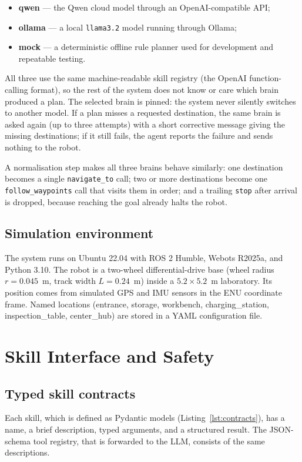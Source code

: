 \documentclass[11pt]{article}
\begin{document}
\begin{itemize}
  \item \textbf{qwen} --- the Qwen cloud model through an
  OpenAI-compatible API;
  \item \textbf{ollama} --- a local \texttt{llama3.2} model running through
  Ollama;
  \item \textbf{mock} --- a deterministic offline rule planner used for
  development and repeatable testing.
\end{itemize}

All three use the same machine-readable skill registry (the OpenAI
function-calling format), so the rest of the system does not know or care which
brain produced a plan. The selected brain is pinned: the system never
silently switches to another model. If a plan misses a requested destination,
the same brain is asked again (up to three attempts) with a short
corrective message giving the missing destinations; if it still fails, the
agent reports the failure and sends nothing to the robot.

A normalisation step makes all three brains behave similarly: one destination
becomes a single \texttt{navigate\_to} call; two or more destinations become
one \texttt{follow\_waypoints} call that visits them in order; and a trailing
\texttt{stop} after arrival is dropped, because reaching the goal already
halts the robot.

\subsection{Simulation environment}
The system runs on Ubuntu 22.04 with ROS 2 Humble, Webots R2025a, and Python
3.10. The robot is a two-wheel differential-drive base (wheel radius
$r=0.045$~m, track width $L=0.24$~m) inside a $5.2\times5.2$~m laboratory. Its
position comes from simulated GPS and IMU sensors in the ENU coordinate frame.
Named locations (entrance, storage, workbench, charging\_station,
inspection\_table, center\_hub) are stored in a YAML configuration file.

\section{Skill Interface and Safety}

\subsection{Typed skill contracts}
Each skill, which is defined as Pydantic models (Listing~\ref{lst:contracts}), has a name, a brief description, typed arguments, and a structured result. The JSON-schema tool registry, that is forwarded to the LLM, consists of the same descriptions.
\end{document}
